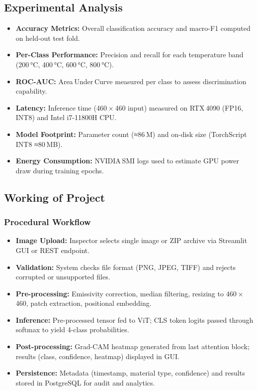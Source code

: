 \subsection{Experimental Analysis}

\begin{itemize}
    \item \textbf{Accuracy Metrics:} Overall classification accuracy and macro-F1 computed on held-out test fold.
    \item \textbf{Per-Class Performance:} Precision and recall for each temperature band (200 °C, 400 °C, 600 °C, 800 °C).
    \item \textbf{ROC-AUC:} Area Under Curve measured per class to assess discrimination capability.
    \item \textbf{Latency:} Inference time (460 × 460 input) measured on RTX 4090 (FP16, INT8) and Intel i7-11800H CPU.
    \item \textbf{Model Footprint:} Parameter count (≈86 M) and on-disk size (TorchScript INT8 ≈80 MB).
    \item \textbf{Energy Consumption:} NVIDIA SMI logs used to estimate GPU power draw during training epochs.
\end{itemize}


\subsection{Working of Project}

\subsubsection{Procedural Workflow}

\begin{itemize}
    \item \textbf{Image Upload:} Inspector selects single image or ZIP archive via Streamlit GUI or REST endpoint.
    \item \textbf{Validation:} System checks file format (PNG, JPEG, TIFF) and rejects corrupted or unsupported files.
    \item \textbf{Pre-processing:} Emissivity correction, median filtering, resizing to 460 × 460, patch extraction, positional embedding.
    \item \textbf{Inference:} Pre-processed tensor fed to ViT; CLS token logits passed through softmax to yield 4-class probabilities.
    \item \textbf{Post-processing:} Grad-CAM heatmap generated from last attention block; results (class, confidence, heatmap) displayed in GUI.
    \item \textbf{Persistence:} Metadata (timestamp, material type, confidence) and results stored in PostgreSQL for audit and analytics.
\end{itemize}

